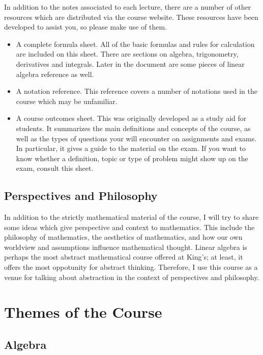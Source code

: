 \documentclass[fleqn]{report}
\begin{document}
In addition to the notes associated to each lecture, there are
a number of other resources which are distributed via
the course website. These resources have been developed to
assist you, so please make use of them. 

\begin{itemize}
\item A complete formula sheet. All of the basic formulas and
rules for calculation are included on this sheet. There are
sections on algebra, trigonometry, derivatives and integrals.
Later in the document are some pieces of linear algebra
reference as well.
\item A notation reference. This reference covers a number of
notations used in the course which may be unfamiliar. 
\item A course outcomes sheet. This was originally
developed as a study aid for students. It summarizes the main
definitions and concepts of the course, as well as the types
of questions your will encounter on assignments and exams. In
particular, it gives a guide to the material on the exam. If
you want to know whether a definition, topic or type of
problem might show up on the exam, consult this sheet. 
\end{itemize}

\section*{Perspectives and Philosophy}

In addition to the strictly mathematical material of the
course, I will try to share some ideas which give perspective
and context to mathematics. This include the philosophy of
mathematics, the aesthetics of mathematics, and how our own worldview and
assumptions influence mathematical thought. Linear algebra is
perhaps the most abstract mathematical course offered at
King's; at least, it offers the most oppotunity for
abstract thinking. Therefore, I use this course as a venue for
talking about abstraction in the context of perspectives and
philosophy.

\chapter{Themes of the Course}

\section{Algebra}
\end{document}
